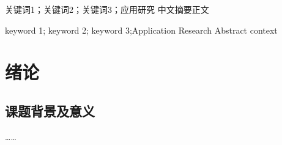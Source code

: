 \documentclass{xjtuthesis_2014_d}
\begin{document}
	\maketitle
	\frontmatter
	\begin{abstractchs}{关键词1；关键词2；关键词3；}{应用研究}
		中文摘要正文
	\end{abstractchs}
	\begin{abstracteng}{keyword 1; keyword 2; keyword 3;}{Application Research}
		Abstract context
	\end{abstracteng}
	
	\maketableofcontents
	\maketableofengcontents
	
	
	\mainmatter
	
	\chapter{绪论}
	\label{chap:绪论}
	\section{课题背景及意义}
	……
\end{document}
